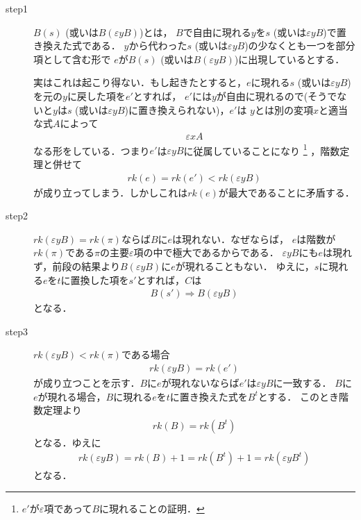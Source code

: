 	\begin{metaprf}\mbox{}
		\begin{description}
			\item[step1]
				$B(s)$ (或いは$B(\varepsilon y B)$)とは，
				$B$で自由に現れる$y$を$s$ (或いは$\varepsilon y B$)で置き換えた式である．
				$y$から代わった$s$ (或いは$\varepsilon y B$)の少なくとも一つを部分項として含む形で
				$e$が$B(s)$ (或いは$B(\varepsilon y B)$)に出現しているとする．
				
				実はこれは起こり得ない．もし起きたとすると，$e$に現れる$s$ (或いは$\varepsilon y B$)
				を元の$y$に戻した項を$e'$とすれば，
				$e'$には$y$が自由に現れるので(そうでないと$y$は$s$
				(或いは$\varepsilon y B$)に置き換えられない)，$e'$は
				$y$とは別の変項$x$と適当な式$A$によって
				\begin{align}
					\varepsilon x A
				\end{align}
				なる形をしている．つまり$e'$は$\varepsilon y B$に従属していることになり
				\footnote{
					$e'$が$\varepsilon$項であって$B$に現れることの証明．
				}
				，階数定理と併せて
				\begin{align}
					rk(e) = rk(e') < rk(\varepsilon y B)
				\end{align}
				が成り立ってしまう．しかしこれは$rk(e)$が最大であることに矛盾する．
				
			\item[step2] $rk(\varepsilon y B) = rk(\pi)$ならば$B$に$e$は現れない．なぜならば，
				$e$は階数が$rk(\pi)$である$\pi$の主要$\varepsilon$項の中で極大であるからである．
				$\varepsilon y B$にも$e$は現れず，前段の結果より$B(\varepsilon y B)$に$e$が現れることもない．
				ゆえに，$s$に現れる$e$を$t$に置換した項を$s'$とすれば，$C$は
				\begin{align}
					B(s') \Longrightarrow B(\varepsilon y B)
				\end{align}
				となる．
			
			\item[step3]
				$rk(\varepsilon y B) < rk(\pi)$である場合
				\begin{align}
					rk(\varepsilon y B) = rk(e')
				\end{align}
				が成り立つことを示す．$B$に$e$が現れないならば$e'$は$\varepsilon y B$に一致する．
				$B$に$e$が現れる場合，$B$に現れる$e$を$t$に置き換えた式を$B^{t}$とする．
				このとき階数定理より
				\begin{align}
					rk(B) = rk(B^{t})
				\end{align}
				となる．ゆえに
				\begin{align}
					rk(\varepsilon y B) = rk(B) + 1 = rk(B^{t}) + 1 = rk(\varepsilon y B^{t})
				\end{align}
				となる．
				\QED
		\end{description}
	\end{metaprf}
	
